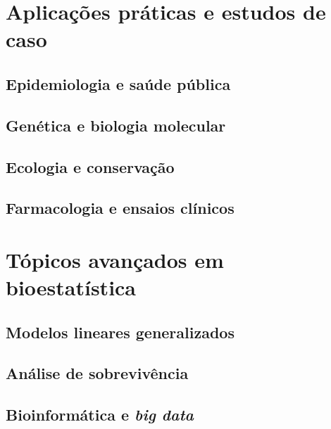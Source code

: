 \documentclass[
]{book}
\begin{document}
\chapter{Aplicações práticas e estudos de caso}\label{aplicauxe7uxf5es-pruxe1ticas-e-estudos-de-caso}

\section{Epidemiologia e saúde pública}\label{epidemiologia-e-sauxfade-puxfablica}

\section{Genética e biologia molecular}\label{genuxe9tica-e-biologia-molecular}

\section{Ecologia e conservação}\label{ecologia-e-conservauxe7uxe3o}

\section{Farmacologia e ensaios clínicos}\label{farmacologia-e-ensaios-cluxednicos}

\chapter{Tópicos avançados em bioestatística}\label{tuxf3picos-avanuxe7ados-em-bioestatuxedstica}

\section{Modelos lineares generalizados}\label{modelos-lineares-generalizados}

\section{Análise de sobrevivência}\label{anuxe1lise-de-sobrevivuxeancia}

\section{\texorpdfstring{Bioinformática e \emph{big data}}{Bioinformática e big data}}\label{bioinformuxe1tica-e-big-data}
\end{document}
